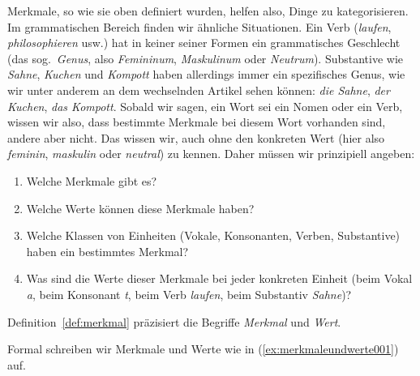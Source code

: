 
Merkmale, so wie sie oben definiert wurden, helfen also, Dinge zu kategorisieren.
Im grammatischen Bereich finden wir ähnliche Situationen.
Ein Verb (\textit{laufen}, \textit{philosophieren} usw.) hat in keiner seiner Formen ein grammatisches Geschlecht (das sog.\ \textit{Genus}, also \textit{Femininum}, \textit{Maskulinum} oder \textit{Neutrum}).
Substantive wie \textit{Sahne}, \textit{Kuchen} und \textit{Kompott} haben allerdings immer ein spezifisches Genus, wie wir unter anderem an dem wechselnden Artikel sehen können: \textit{die Sahne}, \textit{der Kuchen}, \textit{das Kompott}.
Sobald wir sagen, ein Wort sei ein Nomen oder ein Verb, wissen wir also, dass bestimmte Merkmale bei diesem Wort vorhanden sind, andere aber nicht.
Das wissen wir, auch ohne den konkreten Wert (hier also \textit{feminin}, \textit{maskulin} oder \textit{neutral}) zu kennen.
Daher müssen wir prinzipiell angeben:

\begin{enumerate}
  \item Welche Merkmale gibt es?
  \item Welche Werte können diese Merkmale haben?
  \item Welche Klassen von Einheiten (\zB Vokale, Konsonanten, Verben, Substantive) haben ein bestimmtes Merkmal?
  \item Was sind die Werte dieser Merkmale bei jeder konkreten Einheit (beim Vokal \textit{a}, beim Konsonant \textit{t}, beim Verb \textit{laufen}, beim Substantiv \textit{Sahne})?
\end{enumerate}

Definition~\ref{def:merkmal} präzisiert die Begriffe \textit{Merkmal} und \textit{Wert}.


Formal schreiben wir Merkmale und Werte wie in (\ref{ex:merkmaleundwerte001}) auf.

\begin{exe}
  \ex\label{ex:merkmaleundwerte001}
  \begin{xlist}
  \end{xlist}
\end{exe}


